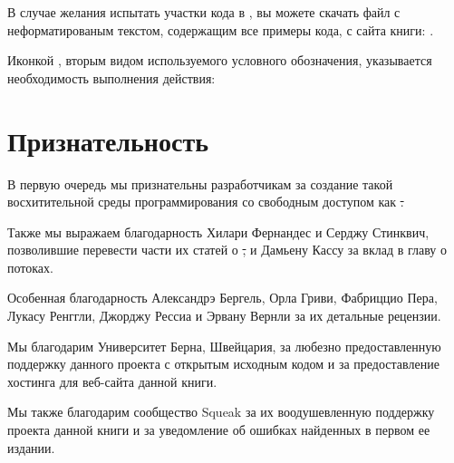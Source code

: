\documentclass[a4paper,10pt,twoside]{book}
\begin{document}
В случае желания испытать участки кода в \pharo, вы можете скачать файл с неформатированым текстом, содержащим все примеры кода, с сайта книги: \pbe.


Иконкой \dothisicon{}, вторым видом используемого условного обозначения, указывается необходимость выполнения действия:


\section*{Признательность}


В первую очередь мы признательны разработчикам \squeak за создание такой восхитительной среды программирования со свободным доступом как \st .


Также мы выражаем благодарность Хилари Фернандес и Серджу Стинквич, позволившие перевести части их статей о \st, и Дамьену Кассу за вклад в главу о потоках.


Особенная благодарность Александрэ Бергель, Орла Гриви, Фабриццио Пера, Лукасу Ренггли, Джорджу Рессиа и Эрвану Вернли за их детальные рецензии.


Мы благодарим Университет Берна, Швейцария, за любезно предоставленную поддержку данного проекта с открытым исходным кодом и за предоставление хостинга для веб-сайта данной книги.


Мы также благодарим сообщество Squeak за их воодушевленную поддержку проекта данной книги и за уведомление об ошибках найденных в первом ее издании.

\ifx\wholebook\relax\else
   
   
\end{document}
